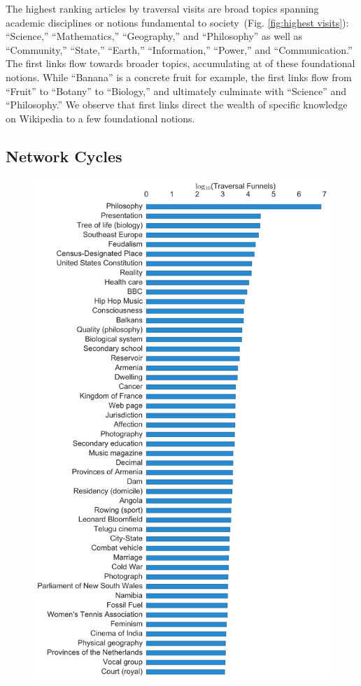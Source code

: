 \documentclass[pre,twocolumn,twoside,superscriptaddress,floatfix]{revtex4-1}
\begin{document}
{The highest ranking articles by traversal visits are broad topics spanning academic disciplines 
or notions fundamental to society~(Fig. \ref{fig:highest visits}): ``Science,'' ``Mathematics,'' ``Geography,'' and ``Philosophy''
as well as ``Community,'' ``State,'' ``Earth,'' ``Information,'' ``Power,'' and ``Communication.''
The first links flow towards broader topics, accumulating at of these foundational notions.
While ``Banana'' is a concrete fruit for example, 
the first links flow from ``Fruit'' to ``Botany'' to ``Biology,'' and ultimately 
culminate with ``Science'' and ``Philosophy.'' 
We observe that first links direct the wealth of specific knowledge on Wikipedia to 
a few foundational notions.

\subsection{Network Cycles}
\label{cycles}
\begin{figure}[tp!]
  \includegraphics[width=\columnwidth]{top_funnels.pdf}

\end{figure}}
\end{document}
